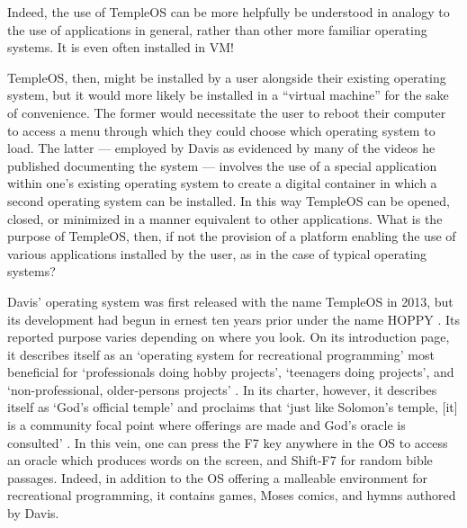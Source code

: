 \documentclass[Draft.tex]{subfiles}
\begin{document}

Indeed, the use of TempleOS can be more helpfully be understood in
analogy to the use of applications in general, rather than other
more familiar operating systems.
It is even often installed in VM!

TempleOS, then, might be installed by a user alongside their existing
operating system, but it would more likely be installed
in a ``virtual machine'' for the sake of convenience.
The former would necessitate the user to reboot their computer
to access a menu through which they could choose which operating system to
load.
The latter --- employed by Davis as evidenced by many of the
videos he published documenting the system --- involves the use of a special
application within one's existing operating system to create a digital container
in which a second operating system can be installed.
In this way TempleOS can be opened, closed, or minimized in a manner
equivalent to other applications.
What is the purpose of TempleOS, then, if not the provision of a platform
enabling the use of various applications installed by the user,
as in the case of typical operating systems?

Davis' operating system was first released with the name TempleOS in 2013,
but its development had begun in ernest ten years prior under the name
HOPPY \parencite{History}.
Its reported purpose varies depending on where you look.
On its introduction page, it describes itself as
an `operating system for recreational programming' most beneficial for
`professionals doing hobby projects', `teenagers doing projects',
and `non-professional, older-persons projects'
\parencite{Welcome}.
In its charter, however, it describes itself as `God's official temple'
and proclaims that
`just like Solomon’s temple, [it] is a community focal point
where offerings are made and God’s oracle is consulted'
\parencite{Charter}.
In this vein, one can press the F7 key anywhere in the OS
to access an oracle which produces words on the screen,
and Shift-F7 for random bible passages.
Indeed, in addition to the OS offering
a malleable environment for recreational programming,
it contains games, Moses comics, and hymns authored by Davis.
\end{document}
